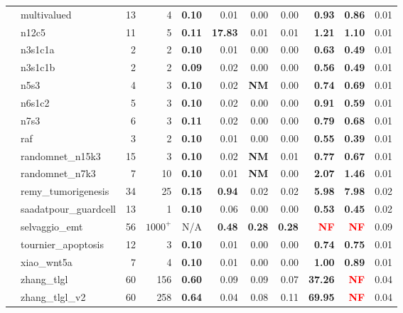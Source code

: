 \documentclass[preprint,12pt]{elsarticle}
\newcounter{rownumber}
\newcommand\rownb{\stepcounter{rownumber}\arabic{rownumber}}
\newcommand{\change}[1]{\textcolor{red}{#1}}
\begin{document}
\begin{table}[!htb]
{\begin{tabular}{rlrrrrrrrrr}
    \rownb & multivalued & 13 & 4 & \textbf{0.10} & 0.01 & 0.00 & 0.00 & \textbf{0.93} & \textbf{0.86} & 0.01\\
    \rownb & n12c5 & 11 & 5 & \textbf{0.11} & \textbf{17.83} & 0.01 & 0.01 & \textbf{1.21} & \textbf{1.10} & 0.01\\
    \rownb & n3s1c1a & 2 & 2 & \textbf{0.10} & 0.01 & 0.00 & 0.00 & \textbf{0.63} & \textbf{0.49} & 0.01\\
    \rownb & n3s1c1b & 2 & 2 & \textbf{0.09} & 0.02 & 0.00 & 0.00 & \textbf{0.56} & \textbf{0.49} & 0.01\\
    \rownb & n5s3 & 4 & 3 & \textbf{0.10} & 0.02 & \textbf{NM} & 0.00 & \textbf{0.74} & \textbf{0.69} & 0.01\\
    \rownb & n6s1c2 & 5 & 3 & \textbf{0.10} & 0.02 & 0.00 & 0.00 & \textbf{0.91} & \textbf{0.59} & 0.01\\
    \rownb & n7s3 & 6 & 3 & \textbf{0.11} & 0.02 & 0.00 & 0.00 & \textbf{0.79} & \textbf{0.68} & 0.01\\
    \rownb & raf & 3 & 2 & \textbf{0.10} & 0.01 & 0.00 & 0.00 & \textbf{0.55} & \textbf{0.39} & 0.01\\
    \rownb & randomnet\_n15k3 & 15 & 3 & \textbf{0.10} & 0.02 & \textbf{NM} & 0.01 & \textbf{0.77} & \textbf{0.67} & 0.01\\
    \rownb & randomnet\_n7k3 & 7 & 10 & \textbf{0.10} & 0.01 & \textbf{NM} & 0.00 & \textbf{2.07} & \textbf{1.46} & 0.01\\
    \rownb & remy\_tumorigenesis & 34 & 25 & \textbf{0.15} & \textbf{0.94} & 0.02 & 0.02 & \textbf{5.98} & \textbf{7.98} & 0.02\\
    \rownb & saadatpour\_guardcell & 13 & 1 & \textbf{0.10} & 0.06 & 0.00 & 0.00 & \textbf{0.53} & \textbf{0.45} & 0.02\\
    \rownb & selvaggio\_emt & 56 & $1000^+$ & N/A & \textbf{0.48} & \textbf{0.28} & \textbf{0.28} & \textbf{\change{NF}} & \textbf{\change{NF}} & 0.09\\
    \rownb & tournier\_apoptosis & 12 & 3 & \textbf{0.10} & 0.01 & 0.00 & 0.00 & \textbf{0.74} & \textbf{0.75} & 0.01\\
    \rownb & xiao\_wnt5a & 7 & 4 & \textbf{0.10} & 0.01 & 0.00 & 0.00 & \textbf{1.00} & \textbf{0.89} & 0.01\\
    \rownb & zhang\_tlgl & 60 & 156 & \textbf{0.60} & 0.09 & 0.09 & 0.07 & \textbf{37.26} & \textbf{\change{NF}} & 0.04\\
    \rownb & zhang\_tlgl\_v2 & 60 & 258 & \textbf{0.64} & 0.04 & 0.08 & 0.11 & \textbf{69.95} & \textbf{\change{NF}} & 0.04\\
    \bottomrule
  \end{tabular}
  }
\end{table}
\setcounter{rownumber}{0}
\end{document}
